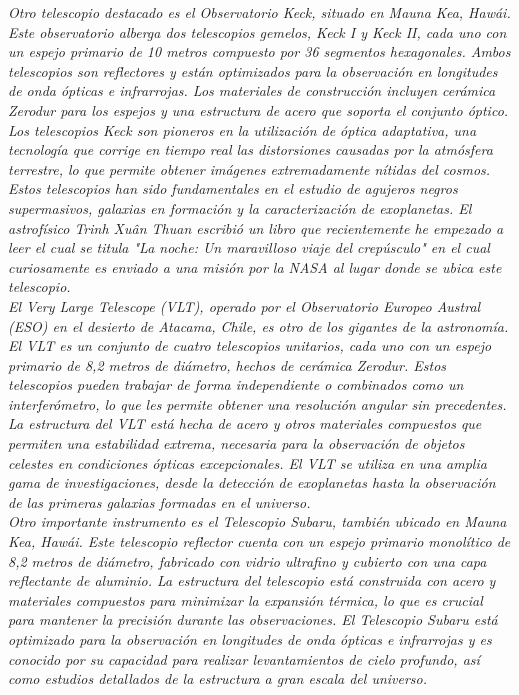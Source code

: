 \documentclass{article}
\begin{document}
\textit{Otro telescopio destacado es el Observatorio Keck, situado en Mauna Kea, Hawái. Este observatorio alberga dos telescopios gemelos, Keck I y Keck II, cada uno con un espejo primario de 10 metros compuesto por 36 segmentos hexagonales. Ambos telescopios son reflectores y están optimizados para la observación en longitudes de onda ópticas e infrarrojas. Los materiales de construcción incluyen cerámica Zerodur para los espejos y una estructura de acero que soporta el conjunto óptico. Los telescopios Keck son pioneros en la utilización de óptica adaptativa, una tecnología que corrige en tiempo real las distorsiones causadas por la atmósfera terrestre, lo que permite obtener imágenes extremadamente nítidas del cosmos. Estos telescopios han sido fundamentales en el estudio de agujeros negros supermasivos, galaxias en formación y la caracterización de exoplanetas. El astrofísico Trinh Xuân Thuan escribió un libro que recientemente he empezado a leer el cual se titula "La noche: Un maravilloso viaje del crepúsculo" en el cual curiosamente es enviado a una misión por la NASA al lugar donde se ubica este telescopio.}\\

\textit{El Very Large Telescope (VLT), operado por el Observatorio Europeo Austral (ESO) en el desierto de Atacama, Chile, es otro de los gigantes de la astronomía. El VLT es un conjunto de cuatro telescopios unitarios, cada uno con un espejo primario de 8,2 metros de diámetro, hechos de cerámica Zerodur. Estos telescopios pueden trabajar de forma independiente o combinados como un interferómetro, lo que les permite obtener una resolución angular sin precedentes. La estructura del VLT está hecha de acero y otros materiales compuestos que permiten una estabilidad extrema, necesaria para la observación de objetos celestes en condiciones ópticas excepcionales. El VLT se utiliza en una amplia gama de investigaciones, desde la detección de exoplanetas hasta la observación de las primeras galaxias formadas en el universo.}\\

\textit{Otro importante instrumento es el Telescopio Subaru, también ubicado en Mauna Kea, Hawái. Este telescopio reflector cuenta con un espejo primario monolítico de 8,2 metros de diámetro, fabricado con vidrio ultrafino y cubierto con una capa reflectante de aluminio. La estructura del telescopio está construida con acero y materiales compuestos para minimizar la expansión térmica, lo que es crucial para mantener la precisión durante las observaciones. El Telescopio Subaru está optimizado para la observación en longitudes de onda ópticas e infrarrojas y es conocido por su capacidad para realizar levantamientos de cielo profundo, así como estudios detallados de la estructura a gran escala del universo.}\\
\end{document}
